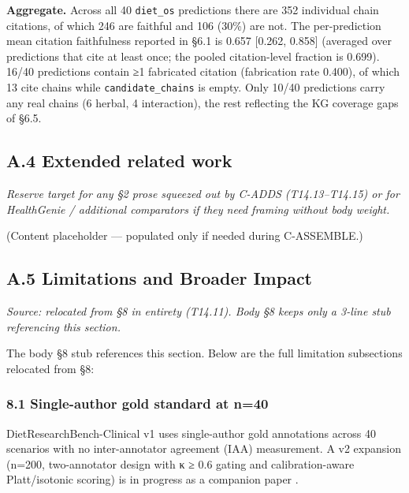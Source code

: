 \documentclass[
]{article}
\begin{document}
\textbf{Aggregate.} Across all 40 \texttt{diet\_os} predictions there
are 352 individual chain citations, of which 246 are faithful and 106
(30\%) are not. The per-prediction mean citation faithfulness reported
in §6.1 is 0.657 {[}0.262, 0.858{]} (averaged over predictions that cite
at least once; the pooled citation-level fraction is 0.699). 16/40
predictions contain ≥1 fabricated citation (fabrication rate 0.400), of
which 13 cite chains while \texttt{candidate\_chains} is empty. Only
10/40 predictions carry any real chains (6 herbal, 4 interaction), the
rest reflecting the KG coverage gaps of §6.5.

\hypertarget{a.4-extended-related-work}{%
\subsection{A.4 Extended related work}\label{a.4-extended-related-work}}

\emph{Reserve target for any §2 prose squeezed out by C-ADDS
(T14.13--T14.15) or for HealthGenie / additional comparators if they
need framing without body weight.}

(Content placeholder --- populated only if needed during C-ASSEMBLE.)

\hypertarget{a.5-limitations-and-broader-impact}{%
\subsection{A.5 Limitations and Broader
Impact}\label{a.5-limitations-and-broader-impact}}

\emph{Source: relocated from §8 in entirety (T14.11). Body §8 keeps only
a 3-line stub referencing this section.}

The body §8 stub references this section. Below are the full limitation
subsections relocated from §8:

\hypertarget{single-author-gold-standard-at-n40}{%
\subsubsection{8.1 Single-author gold standard at
n=40}\label{single-author-gold-standard-at-n40}}

DietResearchBench-Clinical v1 uses single-author gold annotations across
40 scenarios with no inter-annotator agreement (IAA) measurement. A v2
expansion (n=200, two-annotator design with κ ≥ 0.6 gating and
calibration-aware Platt/isotonic scoring) is in progress as a companion
paper \citep{v2benchmark2026}.
\end{document}
